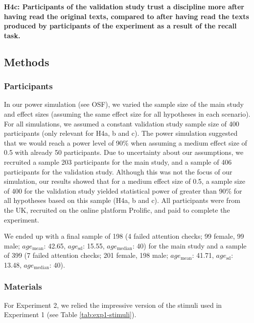 \documentclass[
  doc,floatsintext]{apa6}
\begin{document}
\textbf{H4c: Participants of the validation study trust a discipline more after having read the original texts, compared to after having read the texts produced by participants of the experiment as a result of the recall task.}

\subsection{Methods}\label{methods-1}

\subsubsection{Participants}\label{participants-1}

In our power simulation (see OSF), we varied the sample size of the main study and effect sizes (assuming the same effect size for all hypotheses in each scenario). For all simulations, we assumed a constant validation study sample size of 400 participants (only relevant for H4a, b and c). The power simulation suggested that we would reach a power level of 90\% when assuming a medium effect size of 0.5 with already 50 participants. Due to uncertainty about our assumptions, we recruited a sample 203 participants for the main study, and a sample of 406 participants for the validation study. Although this was not the focus of our simulation, our results showed that for a medium effect size of 0.5, a sample size of 400 for the validation study yielded statistical power of greater than 90\% for all hypotheses based on this sample (H4a, b and c). All participants were from the UK, recruited on the online platform Prolific, and paid to complete the experiment.

We ended up with a final sample of 198 (4 failed attention checks; 99 female, 99 male; \(age_\text{mean}\): 42.65, \(age_\text{sd}\): 15.55, \(age_\text{median}\): 40) for the main study and a sample of 399 (7 failed attention checks; 201 female, 198 male; \(age_\text{mean}\): 41.71, \(age_\text{sd}\): 13.48, \(age_\text{median}\): 40).

\subsubsection{Materials}\label{materials-1}

For Experiment 2, we relied the impressive version of the stimuli used in Experiment 1 (see Table \ref{tab:exp1-stimuli}).
\end{document}
